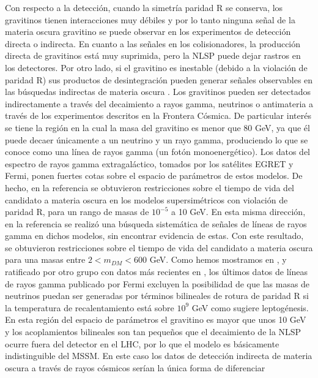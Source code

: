 Con respecto a la detección, cuando la simetría paridad R se conserva,
los gravitinos tienen interacciones muy débiles y por lo tanto ninguna
señal de la materia oscura gravitino se puede observar en los
experimentos de detección directa o indirecta. En cuanto a las señales
en los colisionadores, la producción directa de gravitinos está muy
suprimida, pero la NLSP puede
dejar rastros en los detectores. Por otro lado, si el gravitino es
inestable (debido a la violación de paridad R) sus productos de
desintegración pueden generar señales observables en las búsquedas
indirectas de materia oscura
\cite{Bertone:2007aw,Ibarra:2007wg,Ibarra:2008qg,Covi:2008jy}. Los
gravitinos pueden ser detectados indirectamente a través del
decaimiento a rayos gamma, neutrinos o antimateria a través de los
experimentos descritos en la Frontera Cósmica. De particular interés
se tiene la región en la cual la masa del gravitino es menor que 80
GeV, ya que él puede decaer únicamente a un neutrino y un
rayo gamma, produciendo lo que se conoce como una línea de rayos gamma
(un fotón monoenergético). Los datos del espectro de rayos gamma
extragaláctico, tomados por los satélites EGRET y Fermi, ponen fuertes
cotas sobre el espacio de parámetros de estos modelos. De hecho, en la
referencia \cite{Yuksel:2007dr} se obtuvieron restricciones sobre el
tiempo de vida del candidato a materia oscura en los modelos
supersimétricos con violación de paridad R, para un rango de masas de
$10^{-5}$ a 10 GeV. En esta misma dirección, en la referencia
\cite{Vertongen:2011mu} se realizó una búsqueda sistemática de señales
de líneas de rayos gamma en dichos modelos, sin encontrar evidencia de
estas. Con este resultado, se obtuvieron restricciones sobre el tiempo
de vida del candidato a materia oscura para una masas entre
$2<m_{DM}< 600$ GeV. Como hemos mostramos en \cite{Choi:2010jt},
y ratificado por otro grupo con datos más recientes en
\cite{Garny:2010eg}, los últimos datos de líneas de rayos gamma
publicado por Fermi excluyen la posibilidad de que las masas de
neutrinos puedan ser generadas por términos bilineales de rotura de
paridad R si la temperatura de recalentamiento está sobre $10^9$ GeV
como sugiere leptogénesis.  En esta región del espacio de parámetros
el gravitino es mayor que unos 10 GeV y los acoplamientos bilineales
son tan pequeños que el decaimiento de la
NLSP ocurre fuera del detector en
el LHC, por lo que el modelo es básicamente indistinguible del
MSSM. En este caso los datos de detección indirecta de materia oscura
a través de rayos cósmicos serían la única forma de diferenciar 
